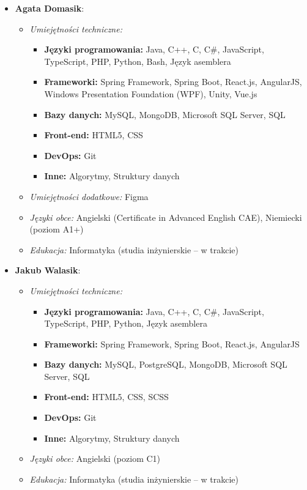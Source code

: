 \documentclass[12pt,a4paper]{book}
\begin{document}
\begin{itemize}
    \item \textbf{Agata Domasik}:
    \begin{itemize}
        \item \textit{Umiejętności techniczne:} 
        \begin{itemize}
            \item \textbf{Języki programowania:} Java, C++, C, C\#, JavaScript, TypeScript, PHP, Python, Bash, Język asemblera
            \item \textbf{Frameworki:} Spring Framework, Spring Boot, React.js, AngularJS, Windows Presentation Foundation (WPF), Unity, Vue.js
            \item \textbf{Bazy danych:} MySQL, MongoDB, Microsoft SQL Server, SQL
            \item \textbf{Front-end:} HTML5, CSS
            \item \textbf{DevOps:} Git
            \item \textbf{Inne:} Algorytmy, Struktury danych
        \end{itemize}
        \item \textit{Umiejętności dodatkowe:} Figma
        \item \textit{Języki obce:} Angielski (Certificate in Advanced English CAE), Niemiecki (poziom A1+)
        \item \textit{Edukacja:} Informatyka (studia inżynierskie – w trakcie)
    \end{itemize}
    
    \item \textbf{Jakub Walasik}:
    \begin{itemize}
        \item \textit{Umiejętności techniczne:} 
        \begin{itemize}
            \item \textbf{Języki programowania:} Java, C++, C, C\#, JavaScript, TypeScript, PHP, Python, Język asemblera
            \item \textbf{Frameworki:} Spring Framework, Spring Boot, React.js, AngularJS
            \item \textbf{Bazy danych:} MySQL, PostgreSQL, MongoDB, Microsoft SQL Server, SQL
            \item \textbf{Front-end:} HTML5, CSS, SCSS
            \item \textbf{DevOps:} Git
            \item \textbf{Inne:} Algorytmy, Struktury danych
        \end{itemize}
        \item \textit{Języki obce:} Angielski (poziom C1)
        \item \textit{Edukacja:} Informatyka (studia inżynierskie – w trakcie)
    \end{itemize}
    

\end{itemize}
\end{document}

